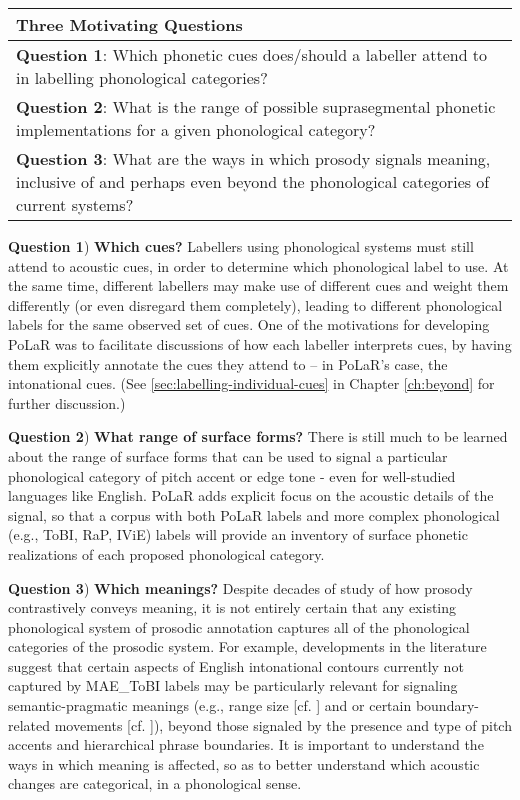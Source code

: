 \begin{center}
\renewcommand{\arraystretch}{1.5}
\begin{tabular}{>{\raggedright\arraybackslash}p{.85\linewidth}}
\textbf{Three Motivating Questions}\\
\hline
\textbf{Question 1}: Which phonetic cues does\slash should a labeller attend to in labelling phonological categories?\\
\textbf{Question 2}: What is the range of possible suprasegmental phonetic implementations for a given phonological category?\\
\textbf{Question 3}: What are the ways in which prosody signals meaning, inclusive of and perhaps even beyond the phonological categories of current systems?\\
\end{tabular}
\end{center}


\textbf{Question 1}) \textbf{Which cues?} Labellers using phonological systems must still attend to acoustic cues, in order to determine which phonological label to use. At the same time, different labellers may make use of different cues and weight them differently (or even disregard them completely), leading to different phonological labels for the same observed set of cues. One of the motivations for developing PoLaR was to facilitate discussions of how each labeller interprets cues, by having them explicitly annotate the cues they attend to -- in PoLaR’s case, the intonational cues.  (See \ref{sec:labelling-individual-cues} in Chapter \ref{ch:beyond} for further discussion.)

\textbf{Question 2}) \textbf{What range of surface forms?} There is still much to be learned about the range of surface forms that can be used to signal a particular phonological category of pitch accent or edge tone - even for well-studied languages like English. PoLaR adds explicit focus on the acoustic details of the signal, so that a corpus with both PoLaR labels and more complex phonological (e.g., ToBI, RaP, IViE) labels will provide an inventory of surface phonetic realizations of each proposed phonological category.

\textbf{Question 3}) \textbf{Which meanings?} Despite decades of study of how prosody contrastively conveys meaning, it is not entirely certain that any existing phonological system of prosodic annotation captures all of the phonological categories of the prosodic system. For example, developments in the literature suggest that certain aspects of English intonational contours currently not captured by MAE\_ToBI labels may be particularly relevant for signaling semantic-pragmatic meanings (e.g., range size [cf. \citealt{ladd94}] and or certain boundary-related movements [cf. \citealt{ahn-16}]), beyond those signaled by the presence and type of pitch accents and hierarchical phrase boundaries. It is important to understand the ways in which meaning is affected, so as to better understand which acoustic changes are categorical, in a phonological sense.

